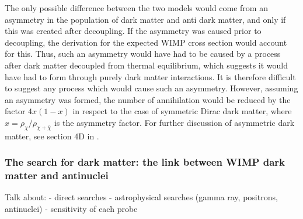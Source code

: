 The only possible difference between the two models would come from an asymmetry in the population of dark matter and anti dark matter, and only if this was created after decoupling. If the asymmetry was caused prior to decoupling, the derivation for the expected WIMP cross section would account for this. Thus, such an asymmetry would have had to be caused by a process after dark matter decoupled from thermal equilibrium, which suggests it would have had to form through purely dark matter interactions. It is therefore difficult to suggest any process which would cause such an asymmetry. However, assuming an asymmetry was formed, the number of annihilation would be reduced by the factor $4x(1-x)$ in respect to the case of symmetric Dirac dark matter, where $x = \rho_\chi / \rho_{\chi + \overline{\chi}}$ is the asymmetry factor. For further discussion of asymmetric dark matter, see section 4D in \cite{BAER20151}. 

\subsubsection{The search for dark matter: the link between WIMP dark matter and antinuclei}
Talk about: 
 - direct searches
 - astrophysical searches (gamma ray, positrons, antinuclei)
 - sensitivity of each probe

%